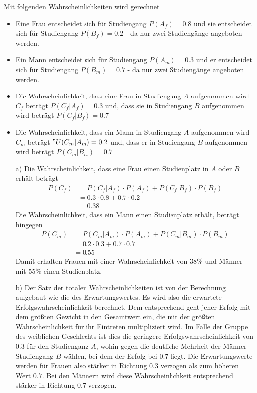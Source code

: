 Mit folgenden Wahrscheinlichkeiten wird gerechnet
\begin{itemize}
	\item Eine Frau entscheidet sich für Studiengang $P(A_f) = 0.8$ und sie entscheidet sich für Studiengang $P(B_f) = 0.2$ - da nur zwei Studiengänge angeboten werden.
	\item Ein Mann entscheidet sich für Studiengang $P(A_m) = 0.3$ und er entscheidet sich für Studiengang $P(B_m) = 0.7$ - da nur zwei Studiengänge angeboten werden.
	\item Die Wahrscheinlichkeit, dass eine Frau in Studiengang $A$ aufgenommen wird $C_f$ beträgt $P(C_f|A_f) = 0.3$ und, dass sie in Studiengang $B$ aufgenommen wird beträgt $P(C_f|B_f) = 0.7$
	\item Die Wahrscheinlichkeit, dass ein Mann in Studiengang $A$ aufgenommen wird $C_m$ beträgt $"U(C_m|A_m) = 0.2$ und, dass er in Studiengang $B$ aufgenommen wird beträgt $P(C_m|B_m) = 0.7$ 
\end{itemize}
\begin{enumerate}
	\item[a)]
		Die Wahrscheinlichkeit, dass eine Frau einen Studienplatz in $A$ oder $B$ erhält beträgt
		\begin{equation*}
			\begin{split}
				P(C_f) 	&= P(C_f|A_f) \cdot P(A_f) + P(C_f|B_f) \cdot P(B_f)\\
						&= 0.3 \cdot 0.8 + 0.7 \cdot 0.2\\
						&= 0.38
			\end{split}
		\end{equation*}
		Die Wahrscheinlichkeit, dass ein Mann einen Studienplatz erhält, beträgt hingegen
		\begin{equation*}
			\begin{split}
				P(C_m)	&= P(C_m|A_m) \cdot P(A_m) + P(C_m|B_m) \cdot P(B_m)\\
						&= 0.2 \cdot 0.3 + 0.7 \cdot 0.7\\
						&= 0.55
			\end{split}
		\end{equation*}
		Damit erhalten Frauen mit einer Wahrscheinlichkeit von 38\% und Männer mit 55\% einen Studienplatz.
	\item[b)] Der Satz der totalen Wahrscheinlichkeiten ist von der Berechnung aufgebaut wie die des Erwartungswertes. Es wird also die erwartete Erfolgswahrscheinlichkeit berechnet. Dem entsprechend geht jener Erfolg mit dem größten Gewicht in den Gesamtwert ein, die mit der größten Wahrscheinlichkeit für ihr Eintreten multipliziert wird.
	Im Falle der Gruppe des weiblichen Geschlechts ist dies die geringere Erfolgswahrscheinlichkeit von $0.3$ für den Studiengang $A$, wohin gegen die deutliche Mehrheit der Männer Studiengang $B$ wählen, bei dem der Erfolg bei $0.7$ liegt. Die Erwartungswerte werden für Frauen also stärker in Richtung $0.3$ verzogen als zum höheren Wert $0.7$. Bei den Männern wird diese Wahrscheinlichkeit entsprechend stärker in Richtung $0.7$ verzogen. 
\end{enumerate}
